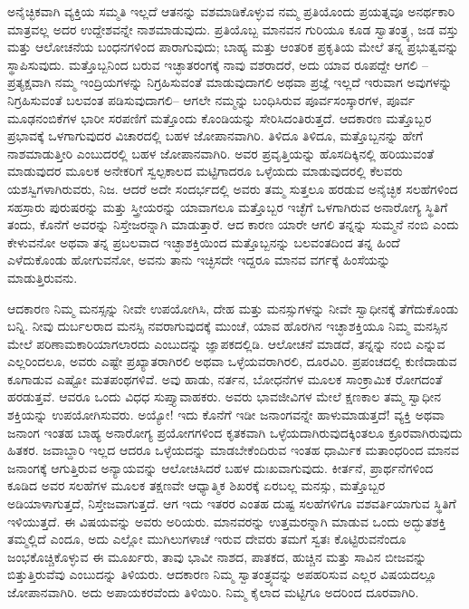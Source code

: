 \vskip 6pt

ಅನೈಚ್ಛಿಕವಾಗಿ ವ್ಯಕ್ತಿಯ ಸಮ್ಮತಿ ಇಲ್ಲದೆ ಆತನನ್ನು ವಶಮಾಡಿಕೊಳ್ಳುವ ನಮ್ಮ ಪ್ರತಿಯೊಂದು ಪ್ರಯತ್ನವೂ ಅನರ್ಥಕಾರಿ ಮಾತ್ರವಲ್ಲ ಅದರ ಉದ್ದೇಶವನ್ನೇ ನಾಶಮಾಡುವುದು. ಪ್ರತಿಯೊಬ್ಬ ಮಾನವನ ಗುರಿಯೂ ಕೂಡ ಸ್ವಾತಂತ್ರ್ಯ, ಜಡ ವಸ್ತು ಮತ್ತು ಆಲೋಚನೆಯ ಬಂಧನಗಳಿಂದ ಪಾರಾಗುವುದು; ಬಾಹ್ಯ ಮತ್ತು ಆಂತರಿಕ ಪ್ರಕೃತಿಯ ಮೇಲೆ ತನ್ನ ಪ್ರಭುತ್ವವನ್ನು ಸ್ಥಾಪಿಸುವುದು. ಮತ್ತೊಬ್ಬನಿಂದ ಬರುವ ಇಚ್ಛಾತರಂಗಕ್ಕೆ ನಾವು ವಶರಾದರೆ, ಅದು ಯಾವ ರೂಪದ್ದೇ ಆಗಲಿ – ಪ್ರತ್ಯಕ್ಷವಾಗಿ ನಮ್ಮ ಇಂದ್ರಿಯಗಳನ್ನು ನಿಗ್ರಹಿಸುವಂತೆ ಮಾಡುವುದಾಗಲಿ ಅಥವಾ ಪ್ರಜ್ಞೆ ಇಲ್ಲದೆ ಇರುವಾಗ ಅವುಗಳನ್ನು ನಿಗ್ರಹಿಸುವಂತೆ ಬಲವಂತ ಪಡಿಸುವುದಾಗಲಿ– ಆಗಲೇ ನಮ್ಮನ್ನು ಬಂಧಿಸಿರುವ ಪೂರ್ವಸಂಸ್ಕಾರಗಳ, ಪೂರ್ವ ಮೂಢನಂಬಿಕೆಗಳ ಭಾರೀ ಸರಪಣಿಗೆ ಮತ್ತೊಂದು ಕೊಂಡಿಯನ್ನು ಸೇರಿಸಿದಂತಿರುತ್ತದೆ. ಆದಕಾರಣ ಮತ್ತೊಬ್ಬರ ಪ್ರಭಾವಕ್ಕೆ ಒಳಗಾಗುವುದರ ವಿಚಾರದಲ್ಲಿ ಬಹಳ ಜೋಪಾನವಾಗಿರಿ. ತಿಳಿದೂ ತಿಳಿದೂ, ಮತ್ತೊಬ್ಬನನ್ನು ಹೇಗೆ ನಾಶಮಾಡುತ್ತೀರಿ ಎಂಬುದರಲ್ಲಿ ಬಹಳ ಜೋಪಾನವಾಗಿರಿ. ಅವರ ಪ್ರವೃತ್ತಿಯನ್ನು ಹೊಸದಿಕ್ಕಿನಲ್ಲಿ ಹರಿಯುವಂತೆ ಮಾಡುವುದರ ಮೂಲಕ ಅನೇಕರಿಗೆ ಸ್ವಲ್ಪಕಾಲದ ಮಟ್ಟಿಗಾದರೂ ಒಳ್ಳೆಯದು ಮಾಡುವುದರಲ್ಲಿ ಕೆಲವರು ಯಶಸ್ವಿಗಳಾಗಿರುವರು, ನಿಜ. ಆದರೆ ಅದೇ ಸಂದರ್ಭದಲ್ಲಿ ಅವರು ತಮ್ಮ ಸುತ್ತಲೂ ಹರಡುವ ಅನೈಚ್ಛಿಕ ಸಲಹೆಗಳಿಂದ ಸಹಸ್ರಾರು ಪುರುಷರನ್ನು ಮತ್ತು ಸ್ತ್ರೀಯರನ್ನು ಯಾವಾಗಲೂ ಮತ್ತೊಬ್ಬರ ಇಚ್ಛೆಗೆ ಒಳಗಾಗಿರುವ ಅನಾರೋಗ್ಯ ಸ್ಥಿತಿಗೆ ತಂದು, ಕೊನೆಗೆ ಅವರನ್ನು ನಿಸ್ತೇಜರನ್ನಾಗಿ ಮಾಡುತ್ತಾರೆ. ಆದ ಕಾರಣ ಯಾರೇ ಆಗಲಿ ತನ್ನನ್ನು ಸುಮ್ಮನೆ ನಂಬಿ ಎಂದು ಕೇಳುವನೋ ಅಥವಾ ತನ್ನ ಪ್ರಬಲವಾದ ಇಚ್ಛಾಶಕ್ತಿಯಿಂದ ಮತ್ತೊಬ್ಬನನ್ನು ಬಲವಂತದಿಂದ ತನ್ನ ಹಿಂದೆ ಎಳೆದುಕೊಂಡು ಹೋಗುವನೋ, ಅವನು ತಾನು ಇಚ್ಛಿಸದೇ ಇದ್ದರೂ ಮಾನವ ವರ್ಗಕ್ಕೆ ಹಿಂಸೆಯನ್ನು ಮಾಡುತ್ತಿರುವನು. 

\vskip 6pt

ಆದಕಾರಣ ನಿಮ್ಮ ಮನಸ್ಸನ್ನು ನೀವೇ ಉಪಯೋಗಿಸಿ, ದೇಹ ಮತ್ತು ಮನಸ್ಸುಗಳನ್ನು ನೀವೇ ಸ್ವಾಧೀನಕ್ಕೆ ತೆಗೆದುಕೊಂಡು ಬನ್ನಿ. ನೀವು ದುರ್ಬಲರಾದ ಮನಸ್ಸಿ ನವರಾಗುವುದಕ್ಕೆ ಮುಂಚೆ, ಯಾವ ಹೊರಗಿನ ಇಚ್ಛಾಶಕ್ತಿಯೂ ನಿಮ್ಮ ಮನಸ್ಸಿನ ಮೇಲೆ ಪರಿಣಾಮಕಾರಿಯಾಗಲಾರದು ಎಂಬುದನ್ನು ಜ್ಞಾಪಕದಲ್ಲಿಡಿ. ಆಲೋಚನೆ ಮಾಡದೆ, ತನ್ನನ್ನು ನಂಬಿ ಎನ್ನುವ ಎಲ್ಲರಿಂದಲೂ, ಅವರು ಎಷ್ಟೇ ಪ್ರಖ್ಯಾತರಾಗಿರಲಿ ಅಥವಾ ಒಳ್ಳೆಯವರಾಗಿರಲಿ, ದೂರವಿರಿ. ಪ್ರಪಂಚದಲ್ಲಿ ಕುಣಿದಾಡುವ ಕೂಗಾಡುವ ಎಷ್ಟೋ ಮತಪಂಥಗಳಿವೆ. ಅವು ಹಾಡು, ನರ್ತನ, ಬೋಧನೆಗಳ ಮೂಲಕ ಸಾಂಕ್ರಾಮಿಕ ರೋಗದಂತೆ ಹರಡುತ್ತವೆ. ಆವರೂ ಒಂದು ವಿಧಧ ಸುಪ್ತ್ಯಾವಾಹಕರು. ಅವರು ಭಾವಜೀವಿಗಳ ಮೇಲೆ ಕ್ಷಣಕಾಲ ತಮ್ಮ ಸ್ವಾಧೀನ ಶಕ್ತಿಯನ್ನು ಉಪಯೋಗಿಸುವರು. ಅಯ್ಯೋ! ಇದು ಕೊನೆಗೆ ಇಡೀ ಜನಾಂಗವನ್ನೇ ಹಾಳುಮಾಡುತ್ತದೆ! ವ್ಯಕ್ತಿ ಅಥವಾ ಜನಾಂಗ ಇಂತಹ ಬಾಹ್ಯ ಅನಾರೋಗ್ಯ ಪ್ರಯೋಗಗಳಿಂದ ಕೃತಕವಾಗಿ ಒಳ್ಳೆಯದಾಗಿರುವುದಕ್ಕಿಂತಲೂ ಕ್ರೂರವಾಗಿರುವುದು ಹಿತಕರ. ಜವಾಬ್ದಾರಿ ಇಲ್ಲದ ಆದರೂ ಒಳ್ಳೆಯದನ್ನು ಮಾಡಬೇಕೆಂದಿರುವ ಇಂತಹ ಧಾರ್ಮಿಕ ಮತಾಂಧರಿಂದ ಮಾನವ ಜನಾಂಗಕ್ಕೆ ಆಗುತ್ತಿರುವ ಅನ್ಯಾಯವನ್ನು ಆಲೋಚಿಸಿದರೆ ಬಹಳ ದುಃಖವಾಗುವುದು. ಕೀರ್ತನೆ, ಪ್ರಾರ್ಥನೆಗಳಿಂದ ಕೂಡಿದ ಅವರ ಸಲಹೆಗಳ ಮೂಲಕ ತಕ್ಷಣವೇ ಆಧ್ಯಾತ್ಮಿಕ ಶಿಖರಕ್ಕೆ ಏರಬಲ್ಲ ಮನಸ್ಸು, ಮತ್ತೊಬ್ಬರ ಅಡಿಯಾಳಾಗುತ್ತದೆ, ನಿಸ್ತೇಜವಾಗುತ್ತದೆ. ಆಗ ಇದು ಇತರರ ಎಂತಹ ದುಷ್ಟ ಸಲಹೆಗಳಿಗೂ ವಶವರ್ತಿಯಾಗುವ ಸ್ಥಿತಿಗೆ ಇಳಿಯುತ್ತದೆ. ಈ ವಿಷಯವನ್ನು ಅವರು ಅರಿಯರು. ಮಾನವರನ್ನು ಉತ್ತಮರನ್ನಾಗಿ ಮಾಡುವ ಒಂದು ಅದ್ಭುತಶಕ್ತಿ ತಮ್ಮಲ್ಲಿದೆ ಎಂದೂ, ಅದು ಎಲ್ಲೋ ಮುಗಿಲುಗಳಾಚೆ ಇರುವ ದೇವರು ತಮಗೆ ಸ್ವತಃ ಕೊಟ್ಟಿರುವನೆಂದೂ ಜಂಭಕೊಚ್ಚಿಕೊಳ್ಳುವ ಈ ಮೂರ್ಖರು, ತಾವು ಭಾವೀ ನಾಶದ, ಪಾತಕದ, ಹುಚ್ಚಿನ ಮತ್ತು ಸಾವಿನ ಬೀಜವನ್ನು ಬಿತ್ತುತ್ತಿರುವೆವು ಎಂಬುದನ್ನು ತಿಳಿಯರು. ಆದಕಾರಣ ನಿಮ್ಮ ಸ್ವಾತಂತ್ರ್ಯವನ್ನು ಅಪಹರಿಸುವ ಎಲ್ಲರ ವಿಷಯದಲ್ಲೂ ಜೋಪಾನವಾಗಿರಿ. ಅದು ಅಪಾಯಕರವೆಂದು ತಿಳಿಯಿರಿ. ನಿಮ್ಮ ಕೈಲಾದ ಮಟ್ಟಿಗೂ ಅದರಿಂದ ದೂರವಾಗಿರಿ. 

